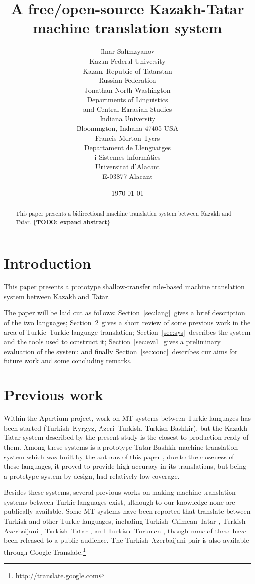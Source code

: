 \documentclass[11pt]{article}
\title{A free/open-source Kazakh-Tatar machine translation system}
\author{Ilnar Salimzyanov\\
  Kazan Federal University\\
  Kazan, Republic of Tatarstan\\
  Russian Federation\\
  \email{ilnar.salimzyan@gmail.com}  \And
  Jonathan North Washington\\
  Departments of Linguistics\\
  and Central Eurasian Studies\\
  Indiana University\\
  Bloomington, Indiana 47405 USA\\
  \email{jonwashi@indiana.edu}  \And
  Francis Morton Tyers\\
  Departament de Llenguatges\\
  i Sistemes Informàtics\\
  Universitat d'Alacant\\
  E-03877 Alacant\\
  \email{ftyers@dlsi.ua.es}}
\date{\today}
\newcommand{\todo}[1]{\{\textbf{TODO: #1}\}}
\begin{document}
\maketitle
\begin{abstract}
This paper presents a bidirectional machine translation system between Kazakh and Tatar.
\todo{expand abstract}
\end{abstract}

\section{Introduction}

This paper presents a prototype shallow-transfer rule-based machine translation
system between Kazakh and Tatar.

The paper will be laid out as follows: Section~\ref{sec:lang}\ gives a brief
description of the two languages; Section~\ref{sec:prev}\ gives a short review
of some previous work in the area of Turkic--Turkic language translation;
Section~\ref{sec:sys}\ describes the system and the tools used to construct it;
Section~\ref{sec:eval}\ gives a preliminary evaluation of the system; and
finally Section~\ref{sec:conc}\ describes our aims for future work and some
concluding remarks.

\section{Previous work}
\label{sec:prev}

Within the Apertium project, work on MT systems between Turkic languages has been started (Turkish--Kyrgyz, Azeri--Turkish, Turkish-Bashkir), but the Kazakh--Tatar system described by the present study is the closest to production-ready of them.  Among these systems is a prototype Tatar-Bashkir machine translation system which was built by the authors of this paper \citep{tyerswashingtonsalimzyanbattalov12}; due to the closeness of these languages, it proved to provide high accuracy in its translations, but being a prototype system by design, had relatively low coverage.

Besides these systems, several previous works on making machine translation systems between Turkic languages 
exist, although to our knowledge none are publically available.
Some MT systems have been reported that translate between Turkish and other Turkic languages, 
including Turkish--Crimean Tatar \citep{altintas01},
Turkish--Azerbaijani \citep{hamzaoglu93}, Turkish--Tatar \citep{suleymanov08}, and
Turkish--Turkmen \citep{tantug07}, though none of these have been released to a public audience. The Turkish--Azerbaijani
pair is also available through Google Translate.\footnote{\url{http://translate.google.com}}
\end{document}
